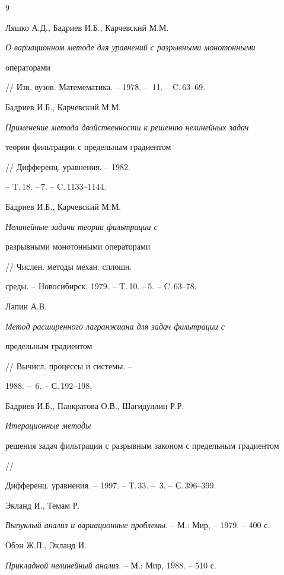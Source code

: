 \begin{thebibliography}{9}







Ляшко А.Д., Бадриев И.Б., Карчевский М.М. 


{\em О вариационном методе для уравнений с разрывными монотонными 


операторами} // Изв. вузов. Матемематика. -- 1978. -- \No\,11. -- C.\,63--69.




Бадриев И.Б., Карчевский М.М. 


{\em Применение метода двойственности к решению нелинейных задач 


теории фильтрации с предельным градиентом} // Дифференц. уравнения. -- 1982.


-- T.\,18. --\No\,7. -- C.\,1133--1144.




Бадриев И.Б., Карчевский М.М. {\em Нелинейные задачи теории фильтрации с 


разрывными монотонными операторами} // Числен. методы механ. сплошн.


среды. -- Новосибирск, 1979. -- T.\,10. --\No\,5. -- C.\,63--78.




Лапин А.В. {\em Метод расширенного лагранжиана для задач фильтрации с


предельным градиентом} // Вычисл. процессы и системы. --


1988. -- \No\,6. -- С.\,192--198.




Бадриев И.Б., Панкратова О.В., Шагидуллин Р.Р. {\em Итерационные методы


решения задач фильтрации с разрывным законом с предельным градиентом} //


Дифференц. уравнения. -- 1997. -- Т.\,33. -- \No\,3. -- С.\,396--399.




Экланд И., Темам Р.


{\em Выпуклый анализ и вариационные проблемы}. -- М.: Мир, -- 1979. -- 400 с.




Обэн Ж.П., Экланд И.


{\em Прикладной нелинейный анализ}. -- М.: Мир, 1988. -- 510 с.





\end{thebibliography}





\vskip 2cm












\label{end}




















